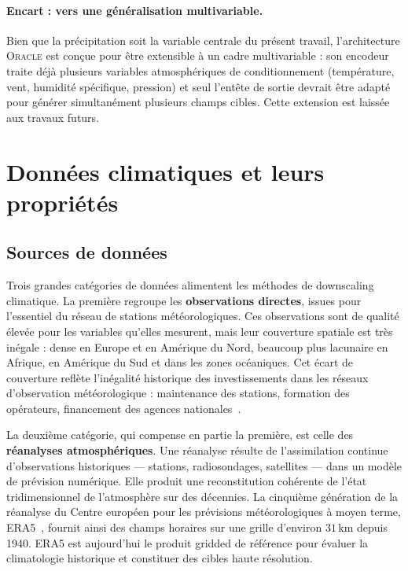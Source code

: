 \documentclass[14pt,a4paper,openany]{extreport}
\theoremstyle{definition}
\newcommand{\Oracle}{\textsc{Oracle}}
\begin{document}
\paragraph{Encart : vers une généralisation multivariable.}
Bien que la précipitation soit la variable centrale du présent travail, l'architecture \Oracle{} est conçue pour être extensible à un cadre multivariable : son encodeur traite déjà plusieurs variables atmosphériques de conditionnement (température, vent, humidité spécifique, pression) et seul l'entête de sortie devrait être adapté pour générer simultanément plusieurs champs cibles. Cette extension est laissée aux travaux futurs.

\section{Données climatiques et leurs propriétés}
\label{sec:donnees}

\subsection{Sources de données}
\label{ssec:sources}

Trois grandes catégories de données alimentent les méthodes de downscaling climatique. La première regroupe les \textbf{observations directes}, issues pour l'essentiel du réseau de stations météorologiques. Ces observations sont de qualité élevée pour les variables qu'elles mesurent, mais leur couverture spatiale est très inégale : dense en Europe et en Amérique du Nord, beaucoup plus lacunaire en Afrique, en Amérique du Sud et dans les zones océaniques. Cet écart de couverture reflète l'inégalité historique des investissements dans les réseaux d'observation météorologique : maintenance des stations, formation des opérateurs, financement des agences nationales~\cite{wmo_gcos_2022}.

La deuxième catégorie, qui compense en partie la première, est celle des \textbf{réanalyses atmosphériques}. Une réanalyse résulte de l'assimilation continue d'observations historiques --- stations, radiosondages, satellites --- dans un modèle de prévision numérique. Elle produit une reconstitution cohérente de l'état tridimensionnel de l'atmosphère sur des décennies. La cinquième génération de la réanalyse du Centre européen pour les prévisions météorologiques à moyen terme, ERA5~\cite{hersbach_era5_2020}, fournit ainsi des champs horaires sur une grille d'environ $31\,\mathrm{km}$ depuis 1940. ERA5 est aujourd'hui le produit gridded de référence pour évaluer la climatologie historique et constituer des cibles haute résolution.
\end{document}
